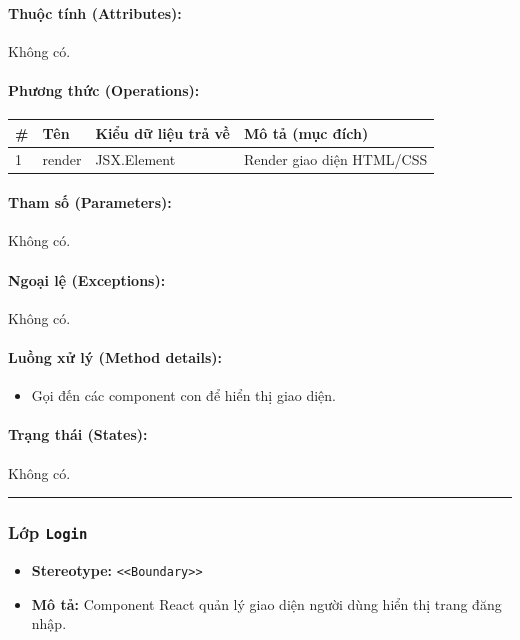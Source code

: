 \documentclass[12pt,a4paper]{article}
\begin{document}
\paragraph{Thuộc tính (Attributes):}
Không có.

\paragraph{Phương thức (Operations):}
\begin{longtable}{|p{0.6cm}|p{5.0cm}|p{2.8cm}|p{5.4cm}|}
\hline
\textbf{\#} & \textbf{Tên} & \textbf{Kiểu dữ liệu trả về} & \textbf{Mô tả (mục đích)} \\ \hline
\endhead
1 & render & JSX.Element & Render giao diện HTML/CSS \\ \hline
\end{longtable}

\paragraph{Tham số (Parameters):}
Không có.

\paragraph{Ngoại lệ (Exceptions):}
Không có.

\paragraph{Luồng xử lý (Method details):}
\begin{itemize}[leftmargin=*]
    \item Gọi đến các component con để hiển thị giao diện.
\end{itemize}


\paragraph{Trạng thái (States):}
Không có.

\vskip 0.5cm
\noindent\rule{\textwidth}{0.5pt}
\vskip 0.5cm

\subsubsection{Lớp \texttt{Login}}

\begin{itemize}[leftmargin=*]
    \item \textbf{Stereotype:} \texttt{\textless{}\textless{}Boundary\textgreater{}\textgreater{}}
    \item \textbf{Mô tả:} Component React quản lý giao diện người dùng hiển thị trang đăng nhập.
\end{itemize}
\end{document}
